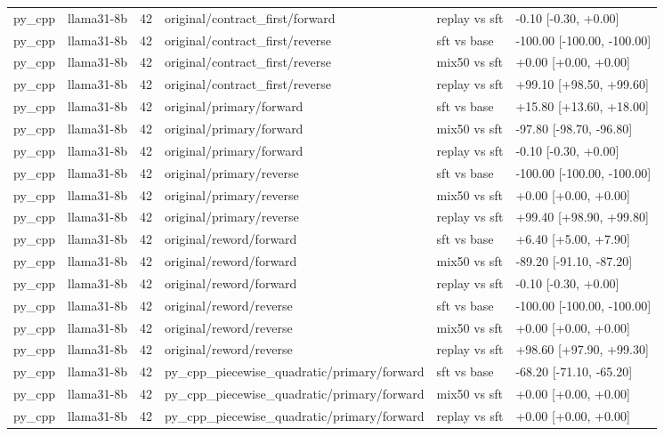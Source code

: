 \begin{table}[t]
\begin{tabular}{llllll}
py\_cpp & llama31-8b & 42 & original/contract\_first/forward & replay vs sft & -0.10 [-0.30, +0.00] \\
py\_cpp & llama31-8b & 42 & original/contract\_first/reverse & sft vs base & -100.00 [-100.00, -100.00] \\
py\_cpp & llama31-8b & 42 & original/contract\_first/reverse & mix50 vs sft & +0.00 [+0.00, +0.00] \\
py\_cpp & llama31-8b & 42 & original/contract\_first/reverse & replay vs sft & +99.10 [+98.50, +99.60] \\
py\_cpp & llama31-8b & 42 & original/primary/forward & sft vs base & +15.80 [+13.60, +18.00] \\
py\_cpp & llama31-8b & 42 & original/primary/forward & mix50 vs sft & -97.80 [-98.70, -96.80] \\
py\_cpp & llama31-8b & 42 & original/primary/forward & replay vs sft & -0.10 [-0.30, +0.00] \\
py\_cpp & llama31-8b & 42 & original/primary/reverse & sft vs base & -100.00 [-100.00, -100.00] \\
py\_cpp & llama31-8b & 42 & original/primary/reverse & mix50 vs sft & +0.00 [+0.00, +0.00] \\
py\_cpp & llama31-8b & 42 & original/primary/reverse & replay vs sft & +99.40 [+98.90, +99.80] \\
py\_cpp & llama31-8b & 42 & original/reword/forward & sft vs base & +6.40 [+5.00, +7.90] \\
py\_cpp & llama31-8b & 42 & original/reword/forward & mix50 vs sft & -89.20 [-91.10, -87.20] \\
py\_cpp & llama31-8b & 42 & original/reword/forward & replay vs sft & -0.10 [-0.30, +0.00] \\
py\_cpp & llama31-8b & 42 & original/reword/reverse & sft vs base & -100.00 [-100.00, -100.00] \\
py\_cpp & llama31-8b & 42 & original/reword/reverse & mix50 vs sft & +0.00 [+0.00, +0.00] \\
py\_cpp & llama31-8b & 42 & original/reword/reverse & replay vs sft & +98.60 [+97.90, +99.30] \\
py\_cpp & llama31-8b & 42 & py\_cpp\_piecewise\_quadratic/primary/forward & sft vs base & -68.20 [-71.10, -65.20] \\
py\_cpp & llama31-8b & 42 & py\_cpp\_piecewise\_quadratic/primary/forward & mix50 vs sft & +0.00 [+0.00, +0.00] \\
py\_cpp & llama31-8b & 42 & py\_cpp\_piecewise\_quadratic/primary/forward & replay vs sft & +0.00 [+0.00, +0.00] \\

\end{tabular}
\end{table}
